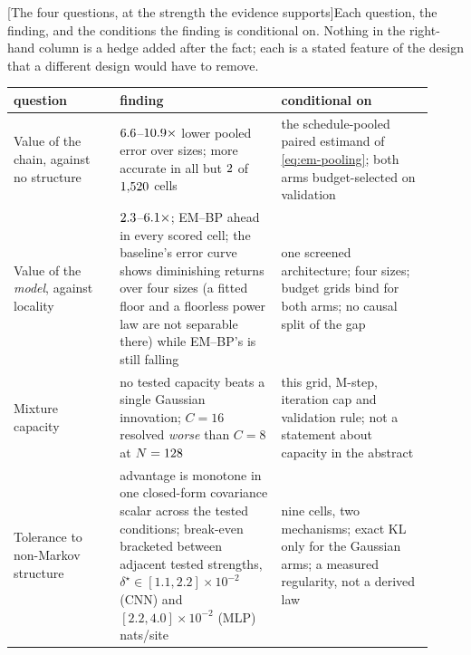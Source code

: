\begin{center}
\begin{minipage}{\linewidth}\small\centering
{}[The four questions, at the strength the evidence
supports]{Each question, the finding, and the conditions the finding is
conditional on. Nothing in the right-hand column is a hedge added after the
fact; each is a stated feature of the design that a different design would have
to remove.}
\label{tab:em-verdicts}
\begin{tabular}{@{}p{0.235\linewidth}p{0.35\linewidth}p{0.33\linewidth}@{}}
\toprule
question & finding & conditional on \\
\midrule
Value of the chain, against no structure
& $6.6$--$10.9\times$ lower pooled error over \nsizesused{} sizes; more accurate in all but $2$ of $1{,}520$ cells
& the schedule-pooled paired estimand of \eqref{eq:em-pooling}; both arms budget-selected on validation \\[0.4em]
Value of the \emph{model}, against locality
& $2.3$--$6.1\times$; EM--BP ahead in every scored cell; the baseline's error curve shows diminishing returns over four sizes (a fitted floor and a floorless power law are not separable there) while EM--BP's is still falling
& one screened architecture; four sizes; budget grids bind for both arms; no causal split of the gap \\[0.4em]
Mixture capacity
& no tested capacity beats a single Gaussian innovation; $C{=}16$ resolved \emph{worse} than $C{=}8$ at $N = 128$
& this grid, M-step, iteration cap and validation rule; not a statement about capacity in the abstract \\[0.4em]
Tolerance to non-Markov structure
& advantage is monotone in one closed-form covariance scalar across the tested conditions; break-even bracketed between adjacent tested strengths, $\delta^{\star} \in [1.1,2.2]\times10^{-2}$ (CNN) and $[2.2,4.0]\times10^{-2}$ (MLP) nats/site
& nine cells, two mechanisms; exact KL only for the Gaussian arms; a measured regularity, not a derived law \\
\bottomrule
\end{tabular}
\end{minipage}
\end{center}

